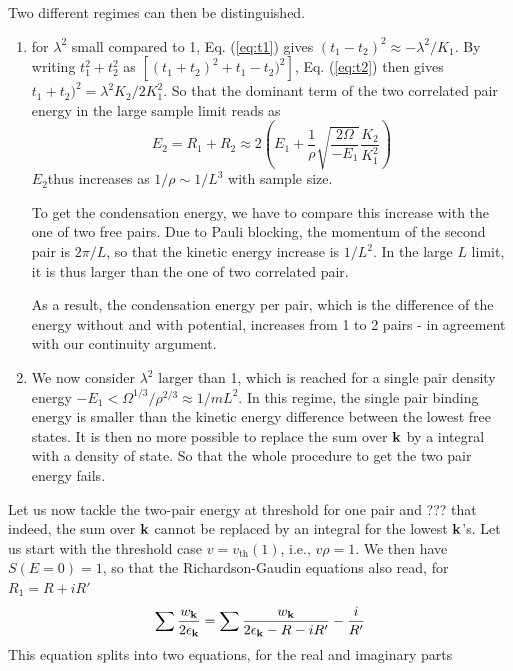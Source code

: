 \documentclass[3p,twocolumn]{elsarticle}
\begin{document}
Two different regimes can then be distinguished.  
\begin{enumerate}
\item for $\lambda^{2}$ small compared to 1, Eq. (\ref{eq:t1}) gives $(t_{1}-t_{2})^{2}\approx-\lambda^{2}/K_{1}$. By writing $t_{1}^{2}+t_{2}^{2}$ as $\left[(t_{1}+t_{2})^{2}+t_{1}-t_{2})^{2}\right]$, Eq. (\ref{eq:t2}) then gives $t_{1}+t_{2})^{2}=\lambda^{2}K_{2}/2K_{1}^{2}$.  So that the dominant term of the two correlated pair energy in the large sample limit reads as 
\begin{equation}
E_{2}=R_{1}+R_{2}\approx2\left(E_{1}+\frac{1}{\rho}\sqrt{\frac{2\Omega}{-E_{1}}}\frac{K_{2}}{K_{1}^{2}}\right)
\end{equation}
$E_{2}$thus increases as $1/\rho\sim1/L^{3}$ with sample size.

To get the condensation energy, we have to compare this increase with the one of two free pairs.  Due to Pauli blocking, the momentum of the second pair is $2\pi/L$, so that the kinetic energy increase is $1/L^{2}$.  In the large $L$ limit, it is thus larger than the one of two correlated pair. 

As a result, the condensation energy per pair, which is the difference of the energy without and with potential, increases from 1 to 2 pairs - in agreement with our continuity argument. 

\item We now consider $\lambda^{2}$ larger than 1, which is reached for a single pair density energy $-E_{1}<\Omega^{1/3}/\rho^{2/3}\approx1/mL^{2}$.  In this regime, the single pair binding energy is smaller than the kinetic energy difference between the lowest free states. It is then no more possible to replace the sum over $\mathbf{k}$ by a integral with a density of state.  So that the whole procedure to get the two pair energy fails.  

\end{enumerate}

Let us now tackle the two-pair energy at threshold for one pair and ??? that indeed, the sum over $\mathbf{k}$ cannot be replaced by an integral for the lowest $\mathbf{k}$'s.
Let us start with the threshold case $v=v_{\text{th}}(1)$, i.e., $v\rho=1$.  We then have $S(E=0)=1$, so that the Richardson-Gaudin equations also read, for $R_1=R+iR'$
\begin{equation}
\sum\frac{w_{\mathbf{k}}}{2\epsilon_{\mathbf{k}}}=\sum\frac{w_{\mathbf{k}}}{2\epsilon_{\mathbf{k}}-R-iR'}-\frac{i}{R'}
\label{eq:}
\end{equation}
This equation splits into two equations, for the real and imaginary parts
\end{document}
